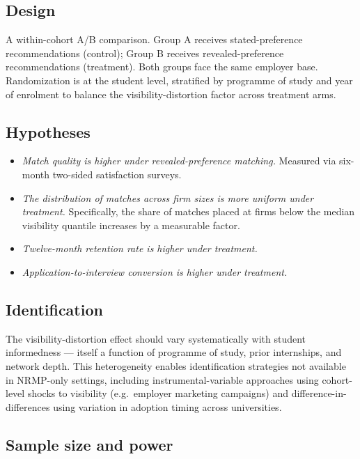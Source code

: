 \documentclass[11pt,a4paper]{article}
\begin{document}
\subsection{Design}

A within-cohort A/B comparison. Group A receives stated-preference recommendations (control); Group B receives revealed-preference recommendations (treatment). Both groups face the same employer base. Randomization is at the student level, stratified by programme of study and year of enrolment to balance the visibility-distortion factor across treatment arms.

\subsection{Hypotheses}

\begin{itemize}[leftmargin=2em,itemsep=2pt,topsep=4pt]
    \item[\textbf{H1}] \textit{Match quality is higher under revealed-preference matching.} Measured via six-month two-sided satisfaction surveys.
    \item[\textbf{H2}] \textit{The distribution of matches across firm sizes is more uniform under treatment.} Specifically, the share of matches placed at firms below the median visibility quantile increases by a measurable factor.
    \item[\textbf{H3}] \textit{Twelve-month retention rate is higher under treatment.}
    \item[\textbf{H4}] \textit{Application-to-interview conversion is higher under treatment.}
\end{itemize}

\subsection{Identification}

The visibility-distortion effect should vary systematically with student informedness --- itself a function of programme of study, prior internships, and network depth. This heterogeneity enables identification strategies not available in NRMP-only settings, including instrumental-variable approaches using cohort-level shocks to visibility (e.g.\ employer marketing campaigns) and difference-in-differences using variation in adoption timing across universities.

\subsection{Sample size and power}
\end{document}
